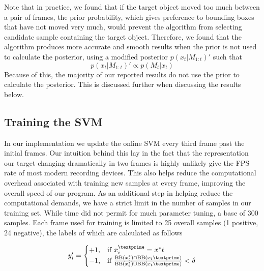 \documentclass{sig-alternate-05-2015}
\begin{document}
Note that in practice, we found that if the target object moved too much between a pair of frames, the prior probability, which gives preference to bounding boxes that have not moved very much, would prevent the algorithm from selecting candidate sample containing the target object.
Therefore, we found that the algorithm produces more accurate and smooth results when the prior is not used to calculate the posterior, using a modified posterior $p(x_t|M_{1:t})'$ such that
\begin{equation}
\label{eq:posterior-mod}
p(x_t|M_{1:t})' \propto p(M_t |x_t)
\end{equation}
Because of this, the majority of our reported results do not use the prior to calculate the posterior.
This is discussed further when discussing the results below.

\subsection{Training the SVM}
\label{sec:training-svm} %
In our implementation we update the online SVM every third frame past the initial frames. Our intuition behind this lay in the fact that the representation our target changing dramatically in two frames is highly unlikely give the FPS rate of most modern recording devices. This also helps reduce the computational overhead associated with training new samples at every frame, improving the overall speed of our program. As an additional step in helping reduce the computational demands, we have a strict limit in the number of samples in our training set. While time did not permit for much parameter tuning, a base of 300 samples. Each frame used for training is limited to 25 overall samples (1 positive, 24 negative), the labels of which are calculated as follows\newline

\begin{equation}
	y_i' =
	\begin{cases}
		+1, & \text{if } x_i^\textprime = x^*t\\
		-1, & \text{if } \frac{\text{BB}(x_t^*)\cap \text{BB}(x_i\textprime)}{\text{BB}(x^*_t)\cup \text{BB}(x_t\textprime)} < \delta\\
	\end{cases}
\end{equation}
\end{document}
